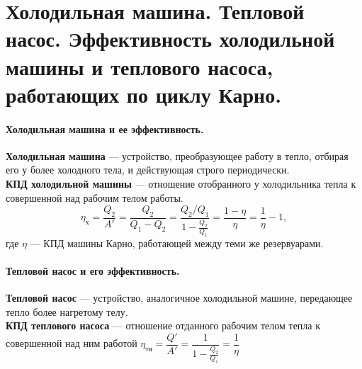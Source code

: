 \section{\normalsize Холодильная машина. Тепловой насос. Эффективность холодильной машины и теплового насоса, работающих по циклу Карно.}
\paragraph{Холодильная машина и ее эффективность.} \textbf{Холодильная машина} --- устройство, преобразующее работу в тепло, отбирая его у более холодного тела, и действующая строго периодически.\\
\textbf{КПД холодильной машины} --- отношение отобранного у холодильника тепла к совершенной над рабочим телом работы. $$\eta_\text{х}=\dfrac{Q_2}{A'}=\dfrac{Q_2}{Q_1-Q_2}=\dfrac{Q_2/Q_1}{1-\frac{Q_2}{Q_1}}=\dfrac{1-\eta}{\eta}=\dfrac{1}{\eta}-1,$$ где $\eta$ --- КПД машины Карно, работающей между теми же резервуарами.
\paragraph{Тепловой насос и его эффективность.} \textbf{Тепловой насос} --- устройство, аналогичное холодильной машине, передающее тепло более нагретому телу.\\
\textbf{КПД теплового насоса} --- отношение отданного рабочим телом тепла к совершенной над ним работой $\eta_\text{тн}=\dfrac{Q'}{A'}=\dfrac{1}{1-\frac{Q_2}{Q_1}}=\dfrac{1}{\eta}$ 